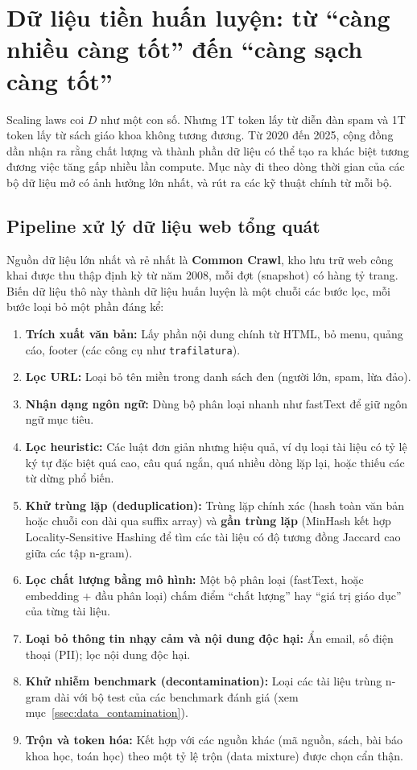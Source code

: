 
\section{Dữ liệu tiền huấn luyện: từ “càng nhiều càng tốt” đến “càng sạch càng tốt”}
\label{sec:pretraining_data}

Scaling laws coi $D$ như một con số. Nhưng 1T token lấy từ diễn đàn spam và 1T token lấy từ sách giáo khoa không tương đương. Từ 2020 đến 2025, cộng đồng dần nhận ra rằng chất lượng và thành phần dữ liệu có thể tạo ra khác biệt tương đương việc tăng gấp nhiều lần compute. Mục này đi theo dòng thời gian của các bộ dữ liệu mở có ảnh hưởng lớn nhất, và rút ra các kỹ thuật chính từ mỗi bộ.

\subsection{Pipeline xử lý dữ liệu web tổng quát}
\label{ssec:data_pipeline}
Nguồn dữ liệu lớn nhất và rẻ nhất là \textbf{Common Crawl}, kho lưu trữ web công khai được thu thập định kỳ từ năm 2008, mỗi đợt (snapshot) có hàng tỷ trang. Biến dữ liệu thô này thành dữ liệu huấn luyện là một chuỗi các bước lọc, mỗi bước loại bỏ một phần đáng kể:

\begin{enumerate}
	\item \textbf{Trích xuất văn bản:} Lấy phần nội dung chính từ HTML, bỏ menu, quảng cáo, footer (các công cụ như \texttt{trafilatura}).
	\item \textbf{Lọc URL:} Loại bỏ tên miền trong danh sách đen (người lớn, spam, lừa đảo).
	\item \textbf{Nhận dạng ngôn ngữ:} Dùng bộ phân loại nhanh như fastText để giữ ngôn ngữ mục tiêu.
	\item \textbf{Lọc heuristic:} Các luật đơn giản nhưng hiệu quả, ví dụ loại tài liệu có tỷ lệ ký tự đặc biệt quá cao, câu quá ngắn, quá nhiều dòng lặp lại, hoặc thiếu các từ dừng phổ biến.
	\item \textbf{Khử trùng lặp (deduplication):} Trùng lặp chính xác (hash toàn văn bản hoặc chuỗi con dài qua suffix array) và \textbf{gần trùng lặp} (MinHash kết hợp Locality-Sensitive Hashing để tìm các tài liệu có độ tương đồng Jaccard cao giữa các tập n-gram).
	\item \textbf{Lọc chất lượng bằng mô hình:} Một bộ phân loại (fastText, hoặc embedding + đầu phân loại) chấm điểm “chất lượng” hay “giá trị giáo dục” của từng tài liệu.
	\item \textbf{Loại bỏ thông tin nhạy cảm và nội dung độc hại:} Ẩn email, số điện thoại (PII); lọc nội dung độc hại.
	\item \textbf{Khử nhiễm benchmark (decontamination):} Loại các tài liệu trùng n-gram dài với bộ test của các benchmark đánh giá (xem mục~\ref{ssec:data_contamination}).
	\item \textbf{Trộn và token hóa:} Kết hợp với các nguồn khác (mã nguồn, sách, bài báo khoa học, toán học) theo một tỷ lệ trộn (data mixture) được chọn cẩn thận.
\end{enumerate}

